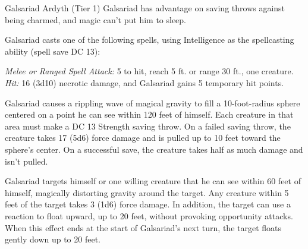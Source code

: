 \documentclass[10pt,a4paper,twoside,bg=print,twocolumn,openany,nodeprecatedcode]{dndbook}
\begin{document}
\begin{DndMonster}[float=t]{Galsariad Ardyth (Tier 1)}
\DndMonsterBasics[
armor-class = {12},
hit-points = {\DndDice{14d8 - 14}},
speed = {30 ft.}
]
\DndMonsterAbilityScores[
 str = 8,
 dex = 14,
 con = 8,
 int = 16,
 wis = 15,
 cha = 12
]
\DndMonsterDetails[
saving-throws = {Int +5, Wis +4},
skills = {Arcana +5, Investigation +5, Nature +5},
senses = {darkvision 120 ft., passive perception 12},
languages = {Common, Draconic, Undercommon},
challenge = 3,
]
Galsariad has advantage on saving throws against being charmed, and magic can't put him to sleep.

Galsariad casts one of the following spells, using Intelligence as the spellcasting ability (spell save DC 13):
\begin{DndMonsterSpells}
\end{DndMonsterSpells}
\textsl{Melee or Ranged Spell Attack:} 5 to hit, reach 5 ft. or range 30 ft., one creature. \textsl{Hit:} 16 (3d10) necrotic damage, and Galsariad gains 5 temporary hit points.

Galsariad causes a rippling wave of magical gravity to fill a 10-foot-radius sphere centered on a point he can see within 120 feet of himself. Each creature in that area must make a DC 13 Strength saving throw. On a failed saving throw, the creature takes 17 (5d6) force damage and is pulled up to 10 feet toward the sphere's center. On a successful save, the creature takes half as much damage and isn't pulled.

Galsariad targets himself or one willing creature that he can see within 60 feet of himself, magically distorting gravity around the target. Any creature within 5 feet of the target takes 3 (1d6) force damage. In addition, the target can use a reaction to float upward, up to 20 feet, without provoking opportunity attacks. When this effect ends at the start of Galsariad's next turn, the target floats gently down up to 20 feet.

\end{DndMonster}
\end{document}
